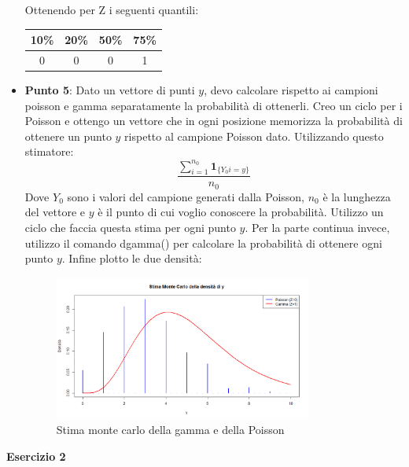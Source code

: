 \documentclass[a4paper,12pt]{article}
\begin{document}
\begin{itemize}
		Ottenendo per Z i seguenti quantili:\newline
	\begin{tabular}{|c|c|c|c|}
		\hline
		10\% & 20\% & 50\% & 75\% \\
		\hline
		0 & 0 & 0 & 1 \\
		\hline
	\end{tabular}
	\item \textbf{Punto 5}: Dato un vettore di punti $y$, devo calcolare rispetto ai campioni poisson e gamma separatamente la probabilità di ottenerli. Creo un ciclo per i Poisson e ottengo un vettore che in ogni posizione memorizza la probabilità di ottenere un punto $y$ rispetto al campione Poisson dato. Utilizzando questo stimatore:\\
	\[
	\frac{\sum_{i=1}^{n_0} \mathbf{1}_{\{Y_0i = y \}}}{n_0}
	\] 
	Dove $Y_0$ sono i valori del campione generati dalla Poisson, $n_0$ è la lunghezza del vettore e $y$ è il punto di cui voglio conoscere la probabilità. Utilizzo un ciclo che faccia questa stima per ogni punto $y$.
	Per la parte continua invece, utilizzo il comando dgamma() per calcolare la probabilità di ottenere ogni punto $y$. Infine plotto le due densità:
	\begin{figure}[h] %
		\centering %
		\includegraphics[width=0.8\textwidth]{doppiadens.png} %
		\caption{Stima monte carlo della gamma e della Poisson} %
		\label{fig:immagine} %
	\end{figure}	
\end{itemize}
\newpage
\centering \textbf{Esercizio 2}\\
\end{document}
